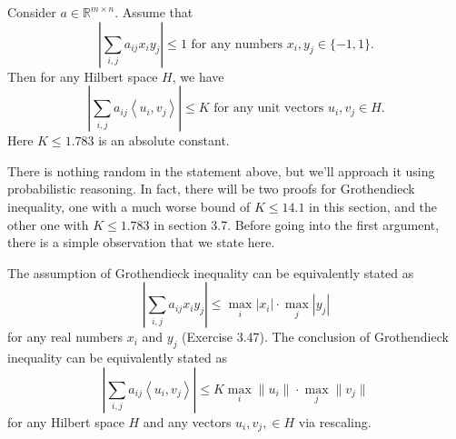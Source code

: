 \begin{theorem}
\label{thm:3.5.1}
Consider $a \in \mathbb{R}^{m \times n}$. Assume that 
\[ \left| \sum_{i, j}^{} a_{ij} x_i y_j \right| \leq 1 \text{ for any numbers } x_i, y_j \in \{-1, 1\}. \]
Then for any Hilbert space $H$, we have 
\[ \left| \sum_{i, j}^{} a_{ij} \left\langle u_i, v_j \right\rangle \right| \leq K \text{ for any unit 
vectors } u_i, v_j \in H. \]
Here $K \leq 1.783$ is an absolute constant.
\end{theorem}

There is nothing random in the statement above, but we'll approach it using probabilistic reasoning. In fact, 
there will be two proofs for Grothendieck inequality, one with a much worse bound of $K \leq 14.1$ in this 
section, and the other one with $K \leq 1.783$ in section 3.7. Before going into the first argument, 
there is a simple observation that we state here.

\begin{remark}
\label{rmk:3.5.2}
The assumption of Grothendieck inequality can be equivalently stated as 
\[ \left| \sum_{i, j}^{} a_{ij}x_iy_j \right| \leq \max_{i}|x_i| \cdot \max_{j}|y_j| \]
for any real numbers $x_i$ and $y_j$ (Exercise 3.47). The conclusion of Grothendieck inequality can be 
equivalently stated as
\[ \left| \sum_{i, j}^{} a_{ij} \left\langle u_i, v_j \right\rangle \right| 
\leq K \max_{i} \lVert u_i \rVert_{} \cdot \max_{j} \lVert v_j \rVert_{} \]
for any Hilbert space $H$ and any vectors $u_i, v_j, \in H$ via rescaling.
\end{remark}

